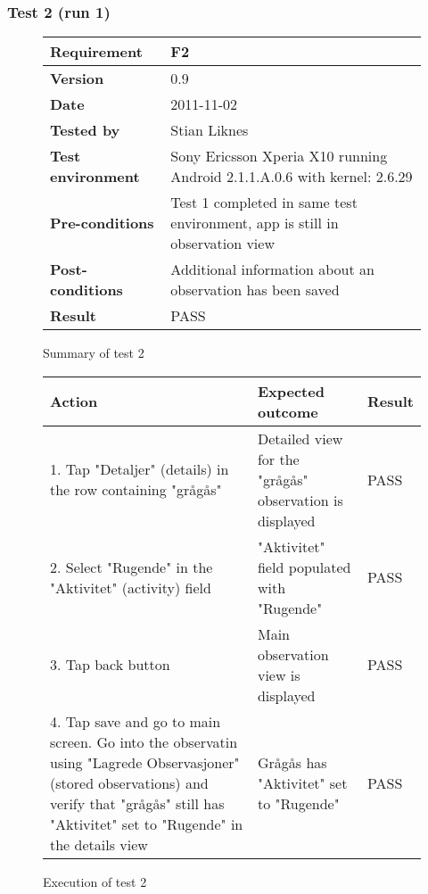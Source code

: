 \newpage
\subsubsection{Test 2 (run 1)}

	\begin{figure}[htb]
		\centering
		\begin{tabular}{|p{3.5cm}|p{7.0cm}|} \hline
			\textbf{Requirement} & F2 \\ \hline
			\textbf{Version} & 0.9 \\ \hline
			\textbf{Date} & 2011-11-02 \\ \hline
			\textbf{Tested by} & Stian Liknes \\ \hline
			\textbf{Test environment} & Sony Ericsson Xperia X10 running Android 2.1.1.A.0.6 with kernel: 2.6.29 \\ \hline
			\textbf{Pre-conditions} & Test 1 completed in same test environment, app is still in observation view \\ \hline
			\textbf{Post-conditions} & Additional information about an observation has been saved \\ \hline
			\textbf{Result} & PASS \\ \hline
		\end{tabular}
		\caption{Summary of test 2}
	\end{figure}

	\begin{figure}[htb]
		\centering

		\begin{tabular}{|p{5.0cm}|p{5.0cm}|p{1cm}|}
			\hline \textbf{Action} & \textbf{Expected outcome} & \textbf{Result} \\ \hline

			1. Tap "Detaljer" (details) in the row containing "grågås" &
			Detailed view for the "grågås" observation is displayed & 
			PASS \\ \hline

			2. Select "Rugende" in the "Aktivitet" (activity) field &
			"Aktivitet" field populated with "Rugende" &
			PASS \\ \hline

			3. Tap back button & 
			Main observation view is displayed & 
			PASS \\ \hline

			4. Tap save and go to main screen. Go into the observatin using
			"Lagrede Observasjoner" (stored observations) and verify that "grågås"
			still has "Aktivitet" set to "Rugende" in the details view &
			Grågås has "Aktivitet" set to "Rugende" &
			PASS \\ \hline
		\end{tabular}
		\caption{Execution of test 2}
	\end{figure}

